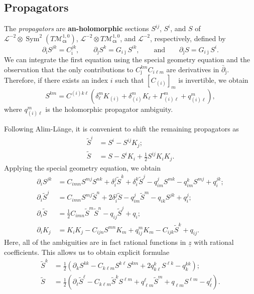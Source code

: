 \documentclass[10pt]{amsart}
\theoremstyle{definition}
\theoremstyle{remark}
\theoremstyle{plain}
\theoremstyle{definition}
\theoremstyle{remark}
\newcommand{\mc}[1]{\mathcal{#1}}
\newcommand{\uz}{\ul{z}}
\newcommand{\on}[1]{\operatorname{#1}}
\newcommand{\ms}[1]{\mathsf{#1}}
\newcommand{\ul}[1]{\underline{#1}}
\newcommand{\1}{\mathbf{1}}
\newcommand{\2}{\mathbf{2}}
\newcommand{\3}{\mathbf{3}}
\newcommand{\cs}{\ms{cs}}
\begin{document}
\subsection{Propagators}%
\label{sub:Propagators}

The \textit{propagators} are \textbf{an-holomorphic} sections $S^{ij}$, $S^i$, and $S$ of $\mc{L}^{-2}\otimes \on{Sym}^2(T\mc{M}_{\cs}^{1,0})$, $\mc{L}^{-2} \otimes T \mc{M}_{\cs}^{1,0}$, and $\mc{L}^{-2}$, respectively, defined by
\[ \partial_{\bar{\imath}} S^{jk} = C_{\bar{\imath}}^{jk}, \qquad \partial_{\bar{\jmath}} S^k = G_{i\bar{\jmath}} S^{ik}, \qquad \text{and} \qquad \partial_{\bar{\jmath}} S = G_{i\bar{\jmath}} S^i. \]
We can integrate the first equation using the special geometry equation and the observation that the only contributions to $C_{\bar{\jmath}}^{km} C_{i\ell m}$ are derivatives in $\bar{\partial}_{\bar{\jmath}}$. Therefore, if there exists an index $i$ such that $[C_{(i)}]_m$ is invertible, we obtain
\[ S^{km} = C^{(i)k\ell} (\delta_{\ell}^m K_{(i)} + \delta_{(i)}^m K_{\ell} + \Gamma^m_{(i)\ell} + q_{(i)\ell}^m), \]
where $q_{(i)\ell}^m$ is the holomorphic propagator ambiguity.

Following Alim-L\"ange, it is convenient to shift the remaining propagators as
\begin{align*}
    \tilde{S}^i &= S^i - S^{ij}K_j; \\
    \tilde{S} &= S - S^i K_i + \frac{1}{2} S^{ij} K_i K_j.
\end{align*}
Applying the special geometry equation, we obtain
\begin{align*}
    \partial_i S^{jk} &= C_{imn}S^{mj} S^{nk} + \delta_i^j\tilde{S}^k + \delta_i^k\tilde{S}^j - q_{im}^j S^{mk} - q_{im}^k S^{mj} + q_i^{jk}; \\
    \partial_i \tilde{S}^j &= C_{imn} S^{mj} \tilde{S}^n + 2 \delta_i^j\tilde{S} - q_{im}^j \tilde{S}^m - q_{ik}S^{jk} + q_i^j; \\
    \partial_i \tilde{S} &= \frac{1}{2} C_{imn}\tilde{S}^m \tilde{S}^n - q_{ij} \tilde{S}^j + q_i; \\
    \partial_i K_j &= K_i K_j - C_{ijn} S^{mn}K_m + q_{ij}^m K_m - C_{ijk} \tilde{S}^k + q_{ij}.
\end{align*}
Here, all of the ambiguities are in fact rational functions in $\uz$ with rational coefficients. This allows us to obtain explicit formulae
\begin{align*}
    \tilde{S}^k &= \frac{1}{2}(\partial_k S^{kk} - C_{k\ell m} S^{k\ell} S^{km} + 2 q_{k\ell}^k S^{\ell k} - q_k^{kk}); \\
    \tilde{S} &= \frac{1}{2} (\partial_{\ell}\tilde{S}^{\ell} - C_{k\ell m} \tilde{S}^k S^{\ell m} + q_{\ell m}^{\ell} \tilde{S}^m + q_{\ell m} S^{\ell m} - q_{\ell}^{\ell}). 
\end{align*}
\end{document}
